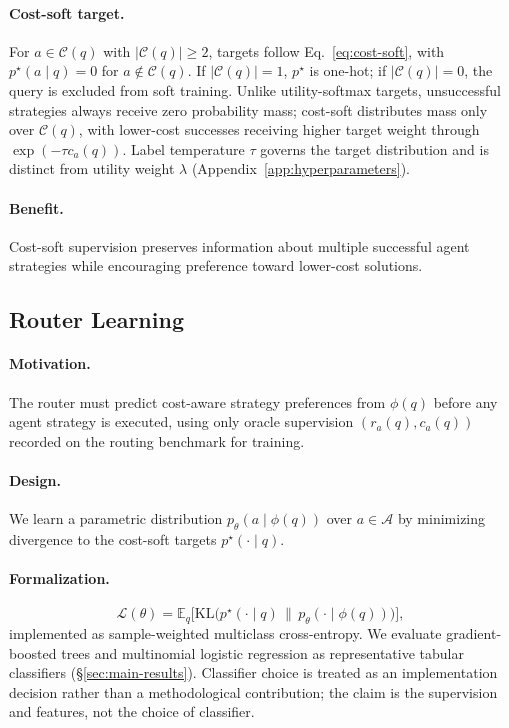 \paragraph{Cost-soft target.}
For $a\in\mathcal{C}(q)$ with $|\mathcal{C}(q)|\ge 2$, targets follow Eq.~\ref{eq:cost-soft},
with $p^\star(a\mid q)=0$ for $a\notin\mathcal{C}(q)$.
If $|\mathcal{C}(q)|=1$, $p^\star$ is one-hot; if $|\mathcal{C}(q)|=0$, the query is excluded
from soft training.
Unlike utility-softmax targets, unsuccessful strategies always receive zero probability mass;
cost-soft distributes mass only over $\mathcal{C}(q)$, with lower-cost successes receiving
higher target weight through $\exp(-\tau c_a(q))$.
Label temperature $\tau$ governs the target distribution and is distinct from utility weight
$\lambda$ (Appendix~\ref{app:hyperparameters}).

\paragraph{Benefit.}
Cost-soft supervision preserves information about multiple successful agent strategies while
encouraging preference toward lower-cost solutions.

\subsection{Router Learning}
\label{sec:method-train}

\paragraph{Motivation.}
The router must predict cost-aware strategy preferences from $\phi(q)$ before any agent
strategy is executed, using only oracle supervision $(r_a(q),c_a(q))$ recorded on the routing
benchmark for training.

\paragraph{Design.}
We learn a parametric distribution $p_\theta(a\mid\phi(q))$ over $a\in\mathcal{A}$ by
minimizing divergence to the cost-soft targets $p^\star(\cdot\mid q)$.

\paragraph{Formalization.}
\begin{equation}
  \mathcal{L}(\theta)=\mathbb{E}_q\bigl[
    \mathrm{KL}\bigl(p^\star(\cdot\mid q)\,\|\,p_\theta(\cdot\mid\phi(q))\bigr)
  \bigr],
  \label{eq:method-kl}
\end{equation}
implemented as sample-weighted multiclass cross-entropy.
We evaluate gradient-boosted trees and multinomial logistic regression as representative
tabular classifiers (\S\ref{sec:main-results}).
Classifier choice is treated as an implementation decision rather than a methodological
contribution; the claim is the supervision and features, not the choice of classifier.

